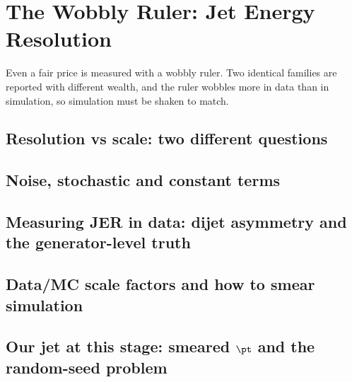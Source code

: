 \chapter{The Wobbly Ruler: Jet Energy Resolution}
\label{ch:wobbly_ruler}

\begin{journeybox}
Even a fair price is measured with a wobbly ruler. Two identical families are
reported with different wealth, and the ruler wobbles more in data than in
simulation, so simulation must be shaken to match.
\end{journeybox}


\section{Resolution vs scale: two different questions}
\label{sec:wobbly_ruler:resolution_vs_scale_two_different_questi}

\section{Noise, stochastic and constant terms}
\label{sec:wobbly_ruler:noise_stochastic_and_constant_terms}

\section{Measuring JER in data: dijet asymmetry and the generator-level truth}
\label{sec:wobbly_ruler:measuring_jer_in_data_dijet_asymmetry_an}

\section{Data/MC scale factors and how to smear simulation}
\label{sec:wobbly_ruler:data_mc_scale_factors_and_how_to_smear_s}

\section{Our jet at this stage: smeared $\pt$ and the random-seed problem}
\label{sec:wobbly_ruler:our_jet_at_this_stage_smeared_pt_and_the}

